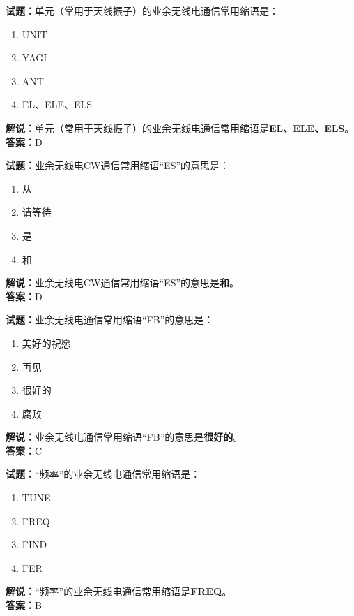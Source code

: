 \documentclass{ctexbook}
\begin{document}
\bigskip


\noindent\textbf{试题：}单元（常用于天线振子）的业余无线电通信常用缩语是：
\begin{enumerate}[leftmargin=3em]
\item UNIT
\item YAGI
\item ANT
\item EL、ELE、ELS
\end{enumerate}
\noindent\textbf{解说：}单元（常用于天线振子）的业余无线电通信常用缩语是\textbf{EL、ELE、ELS}。\\\noindent\textbf{答案：}D

\bigskip


\noindent\textbf{试题：}业余无线电CW通信常用缩语“ES”的意思是：
\begin{enumerate}[leftmargin=3em]
\item 从
\item 请等待
\item 是
\item 和
\end{enumerate}
\noindent\textbf{解说：}业余无线电CW通信常用缩语“ES”的意思是\textbf{和}。\\\noindent\textbf{答案：}D

\bigskip


\noindent\textbf{试题：}业余无线电通信常用缩语“FB”的意思是：
\begin{enumerate}[leftmargin=3em]
\item 美好的祝愿
\item 再见
\item 很好的
\item 腐败
\end{enumerate}
\noindent\textbf{解说：}业余无线电通信常用缩语“FB”的意思是\textbf{很好的}。\\\noindent\textbf{答案：}C

\bigskip


\noindent\textbf{试题：}“频率”的业余无线电通信常用缩语是：
\begin{enumerate}[leftmargin=3em]
\item TUNE
\item FREQ
\item FIND
\item FER
\end{enumerate}
\noindent\textbf{解说：}“频率”的业余无线电通信常用缩语是\textbf{FREQ}。\\\noindent\textbf{答案：}B

\bigskip
\end{document}
